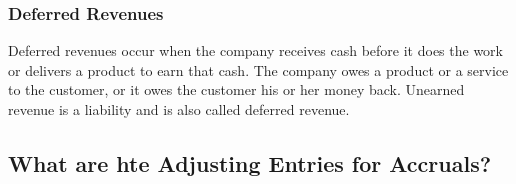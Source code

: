 \documentclass{article}
\begin{document}
\subsubsection{Deferred Revenues}

Deferred revenues occur when the company receives cash before it does the work or delivers a product to earn that cash. The company owes a product or a service to the customer, or it owes the customer his or her money back. Unearned revenue is a liability and is also called deferred revenue. 

\subsection{What are hte Adjusting Entries for Accruals?}
\end{document}
